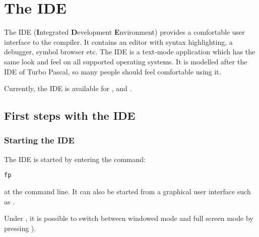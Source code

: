 %
%
%
%
%
\chapter{The IDE}

The IDE (\textbf{I}ntegrated \textbf{D}evelopment \textbf{E}nvironment)
provides a comfortable user interface to the compiler. It contains an
editor with syntax highlighting, a debugger, symbol browser etc.
The IDE is a text-mode application which has the same look and feel
on all supported operating systems. It is modelled after the IDE of Turbo
Pascal, so many people should feel comfortable using it.

Currently, the IDE is available for \dos, \windows and \linux.

\section{First steps with the IDE}
%
%
\subsection{Starting the IDE}
The IDE is started by entering the command:
\begin{verbatim}
fp
\end{verbatim}
at the command line. It can also be started from a graphical user
interface such as \windows.
\begin{remark}
Under \windows, it is possible to switch between windowed mode and
full screen mode by pressing ).
\end{remark}
%
%

